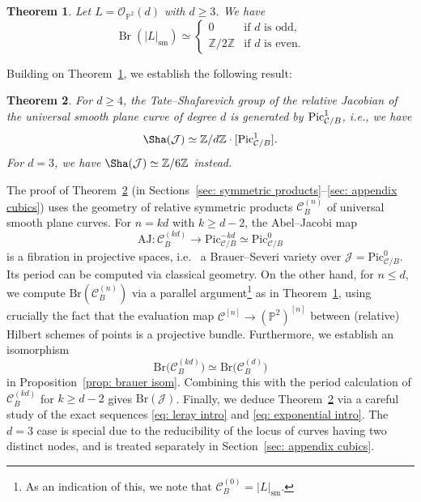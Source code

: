 \documentclass[11pt]{amsart}
\theoremstyle{plain}
\newtheorem{thm}{Theorem}[section]
\theoremstyle{definition}
\theoremstyle{remark}
\DeclareMathOperator{\Br}{Br}
\newcommand{\Pic}{\mathop{\rm Pic}\nolimits}
\begin{document}
\begin{thm}\label{thm: brauer P2}
    Let $L = \mathcal{O}_{\mathbb P^2}(d)$ with $d\geq 3$. We have
    \[
    \Br(|L|_\mathrm{sm}) \simeq \begin{cases}0 & \text{if } d \text{ is odd,} \\
    \mathbb Z / 2 \mathbb Z &\text{if } d \text{ is even.}\end{cases}
    \]
\end{thm}

Building on Theorem~\ref{thm: brauer P2}, we establish the following result:


\begin{thm}\label{thm: tate-shafarevich}
    For $d\geq 4$, the Tate--Shafarevich group of the relative Jacobian of the universal smooth plane curve of degree $d$ is generated by $\Pic^1_{\mathcal C / B}$, i.e., we have
    $$\Sha(\mathcal{J}) \simeq \mathbb Z / d \mathbb Z \cdot [\Pic^1_{\mathcal C / B}].$$
    For $d=3$, we have $\Sha(\mathcal{J}) \simeq \mathbb Z/6 \mathbb Z$ instead.
\end{thm}


The proof of Theorem~\ref{thm: tate-shafarevich} (in Sections~\ref{sec: symmetric products}--\ref{sec: appendix cubics}) uses the geometry of relative symmetric products $\mathcal{C}^{(n)}_B$ of universal smooth plane curves. For $n = kd$ with $k\geq d-2$, the Abel--Jacobi map
\[
\mathrm{AJ}: \mathcal{C}_B^{(kd)} \to \mathrm{Pic}^{-kd}_{\mathcal{C}/B} \simeq \mathrm{Pic}^0_{\mathcal{C}/B}
\]
is a fibration in projective spaces, i.e.~ a Brauer--Severi variety over $\mathcal{J} = \mathrm{Pic}^0_{\mathcal{C}/B}$. Its period can be computed via classical geometry. On the other hand, for $n\leq d$, we compute $\mathrm{Br}(\mathcal{C}^{(n)}_B)$ via a parallel argument\footnote{As an indication of this, we note that $\mathcal{C}_B^{(0)} =  |L|_\mathrm{sm}$.} as in Theorem~\ref{thm: brauer P2}, using crucially the fact that the evaluation map $\mathcal{C}^{[n]}\to (\mathbb P^2)^{[n]}$ between (relative) Hilbert schemes of points is a projective bundle. Furthermore, we establish an isomorphism
\[
\mathrm{Br}\Big(\mathcal{C}_B^{(kd)}\Big) \simeq \mathrm{Br}\Big(\mathcal{C}_B^{(d)}\Big)
\]
in Proposition~\ref{prop: brauer isom}. Combining this with the period calculation of $\mathcal{C}_B^{(kd)}$ for $k \geq d-2$ gives $\mathrm{Br}(\mathcal{J})$. Finally, we deduce Theorem~\ref{thm: tate-shafarevich} via a careful study of the exact sequences \eqref{eq: leray intro} and \eqref{eq: exponential intro}. The $d=3$ case is special due to the reducibility of the locus of curves having two distinct nodes, and is treated separately in Section~\ref{sec: appendix cubics}.
\end{document}

